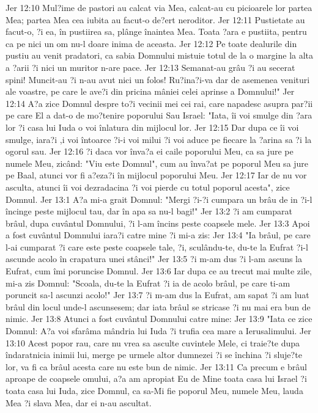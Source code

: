 Jer 12:10  Mul?ime de pastori au calcat via Mea, calcat-au cu picioarele lor partea Mea; partea Mea cea iubita au facut-o de?ert neroditor.
Jer 12:11  Pustietate au facut-o, ?i ea, în pustiirea sa, plânge înaintea Mea. Toata ?ara e pustiita, pentru ca pe nici un om nu-l doare inima de aceasta.
Jer 12:12  Pe toate dealurile din pustiu au venit pradatori, ca sabia Domnului mistuie totul de la o margine la alta a ?arii ?i nici un muritor n-are pace.
Jer 12:13  Semanat-au grâu ?i au secerat spini! Muncit-au ?i n-au avut nici un folos! Ru?ina?i-va dar de asemenea venituri ale voastre, pe care le ave?i din pricina mâniei celei aprinse a Domnului!"
Jer 12:14  A?a zice Domnul despre to?i vecinii mei cei rai, care napadesc asupra par?ii pe care El a dat-o de mo?tenire poporului Sau Israel: "Iata, îi voi smulge din ?ara lor ?i casa lui Iuda o voi înlatura din mijlocul lor.
Jer 12:15  Dar dupa ce îi voi smulge, iara?i ,i voi întoarce ?i-i voi milui ?i voi aduce pe fiecare la ?arina sa ?i la ogorul sau.
Jer 12:16  ?i daca vor înva?a ei caile poporului Meu, ca sa jure pe numele Meu, zicând: "Viu este Domnul", cum au înva?at pe poporul Meu sa jure pe Baal, atunci vor fi a?eza?i în mijlocul poporului Meu.
Jer 12:17  Iar de nu vor asculta, atunci îi voi dezradacina ?i voi pierde cu totul poporul acesta", zice Domnul.
Jer 13:1  A?a mi-a grait Domnul: "Mergi ?i-?i cumpara un brâu de in ?i-l încinge peste mijlocul tau, dar în apa sa nu-l bagi!"
Jer 13:2  ?i am cumparat brâul, dupa cuvântul Domnului, ?i l-am încins peste coapsele mele.
Jer 13:3  Apoi a fost cuvântul Domnului iara?i catre mine ?i mi-a zis:
Jer 13:4  "Ia brâul, pe care l-ai cumparat ?i care este peste coapsele tale, ?i, sculându-te, du-te la Eufrat ?i-l ascunde acolo în crapatura unei stânci!"
Jer 13:5  ?i m-am dus ?i l-am ascuns la Eufrat, cum îmi poruncise Domnul.
Jer 13:6  Iar dupa ce au trecut mai multe zile, mi-a zis Domnul: "Scoala, du-te la Eufrat ?i ia de acolo brâul, pe care ti-am poruncit sa-l ascunzi acolo!"
Jer 13:7  ?i m-am dus la Eufrat, am sapat ?i am luat brâul din locul unde-l ascunsesem; dar iata brâul se stricase ?i nu mai era bun de nimic.
Jer 13:8  Atunci a fost cuvântul Domnului catre mine:
Jer 13:9  "Iata ce zice Domnul: A?a voi sfarâma mândria lui Iuda ?i trufia cea mare a Ierusalimului.
Jer 13:10  Acest popor rau, care nu vrea sa asculte cuvintele Mele, ci traie?te dupa îndaratnicia inimii lui, merge pe urmele altor dumnezei ?i se închina ?i sluje?te lor, va fi ca brâul acesta care nu este bun de nimic.
Jer 13:11  Ca precum e brâul aproape de coapsele omului, a?a am apropiat Eu de Mine toata casa lui Israel ?i toata casa lui Iuda, zice Domnul, ca sa-Mi fie poporul Meu, numele Meu, lauda Mea ?i slava Mea, dar ei n-au ascultat.
